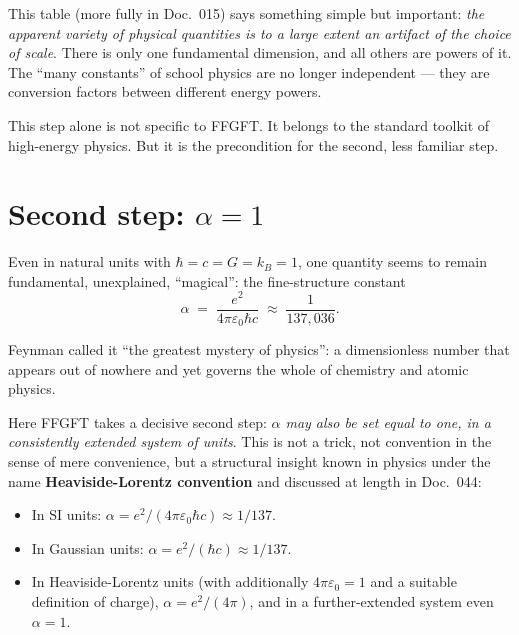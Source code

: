 \begin{center}
\end{center}

This table (more fully in Doc.~015) says something simple but
important: \emph{the apparent variety of physical quantities is to a
large extent an artifact of the choice of scale}. There is only one
fundamental dimension, and all others are powers of it. The ``many
constants'' of school physics are no longer independent --- they are
conversion factors between different energy powers.

This step alone is not specific to FFGFT. It belongs to the standard
toolkit of high-energy physics. But it is the precondition for the
second, less familiar step.

\section{Second step: $\alpha = 1$}

Even in natural units with $\hbar = c = G = k_B = 1$, one quantity
seems to remain fundamental, unexplained, ``magical'': the
fine-structure constant
\[
  \alpha \;=\; \frac{e^{2}}{4\pi\varepsilon_{0}\hbar c} \;\approx\; \frac{1}{137{,}036}.
\]

Feynman called it ``the greatest mystery of physics'': a dimensionless
number that appears out of nowhere and yet governs the whole of
chemistry and atomic physics.

Here FFGFT takes a decisive second step: \emph{$\alpha$ may also be set
equal to one, in a consistently extended system of units}. This is not
a trick, not convention in the sense of mere convenience, but a
structural insight known in physics under the name
\textbf{Heaviside-Lorentz convention} and discussed at length in
Doc.~044:

\begin{itemize}\setlength\itemsep{0pt}
  \item In SI units: $\alpha = e^{2}/(4\pi\varepsilon_{0}\hbar c) \approx 1/137$.
  \item In Gaussian units: $\alpha = e^{2}/(\hbar c) \approx 1/137$.
  \item In Heaviside-Lorentz units (with additionally $4\pi\varepsilon_{0} = 1$
        and a suitable definition of charge), $\alpha = e^{2}/(4\pi)$,
        and in a further-extended system even $\alpha = 1$.
\end{itemize}

